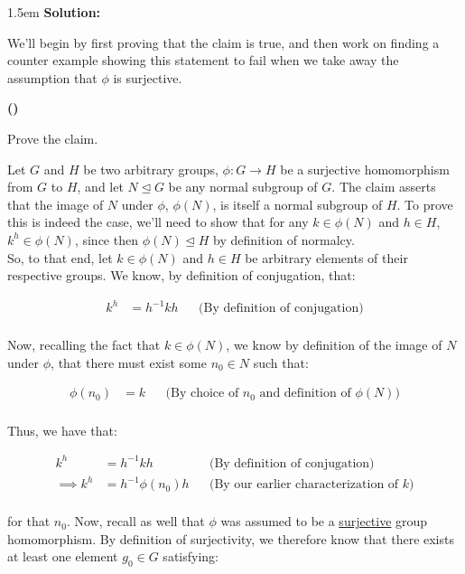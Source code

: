 \documentclass{article}
\newenvironment{solution}{
	\vspace{.5em}
	\par
	\begin{adjustwidth}{1.5em}{}
	\textbf{{Solution:}}
	\par
	\vspace{.5em}
}{
	\vspace{1em}
	\end{adjustwidth}
	\setcounter{step}{0}
	\newpage
}
\newcounter{step}
\renewcommand{\thestep}{\Roman{step}}
\newenvironment{step}{
	\refstepcounter{step}
	\vspace{1em}\par\noindent
	\ignorespaces\noindent\textbf{(\thestep)}
	\ignorespaces
}{
	\par
	\vspace{1.5em}
}
\begin{document}
\begin{solution}
	We'll begin by first proving that the claim is true, and then work on finding a counter example showing this statement to fail when we take away the assumption that $\phi$ is surjective. \\

	\begin{step}
		Prove the claim.
	\end{step}

	Let $G$ and $H$ be two arbitrary groups, $\phi \colon G \rightarrow H$ be a surjective homomorphism from $G$ to $H$, and let $N \unlhd G$ be any normal subgroup of $G$. The claim asserts that the image of $N$ under $\phi$, $\phi(N)$, is itself a normal subgroup of $H$. To prove this is indeed the case, we'll need to show that for any $k \in \phi(N)$ and $h \in H$, $k^{h} \in \phi(N)$, since then $\phi(N) \unlhd H$ by definition of normalcy. \\

	So, to that end, let $k \in \phi(N)$ and $h \in H$ be arbitrary elements of their respective groups. We know, by definition of conjugation, that:

	\begin{align*}
		k^{h} &= h^{-1}kh &&\text{(By definition of conjugation)} \\
	\end{align*}

	Now, recalling the fact that $k \in \phi(N)$, we know by definition of the image of $N$ under $\phi$, that there must exist some $n_{0} \in N$ such that:

	\begin{align*}
		\phi(n_{0}) &= k &&\text{(By choice of $n_{0}$ and definition of $\phi(N)$)} \\
	\end{align*}

	Thus, we have that:

	\begin{align*}
		k^{h} &= h^{-1}kh &&\text{(By definition of conjugation)} \\
		\implies k^{h} &= h^{-1}\phi(n_{0})h &&\text{(By our earlier characterization of $k$)} \\
	\end{align*}

	for that $n_{0}$. Now, recall as well that $\phi$ was assumed to be a \underline{surjective} group homomorphism. By definition of surjectivity, we therefore know that there exists at least one element $g_{0} \in G$ satisfying:


\end{solution}
\end{document}
